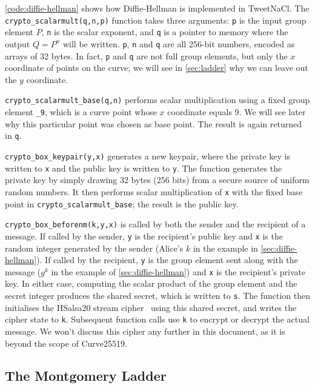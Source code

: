 \documentclass{article}
\begin{document}
\autoref{code:diffie-hellman} shows how Diffie-Hellman is implemented in TweetNaCl.
The \verb|crypto_scalarmult(q,n,p)| function takes three arguments: \verb|p| is the input group element $P$, \verb|n| is the scalar exponent, and \verb|q| is a pointer to memory where the output $Q=P^n$ will be written.
\verb|p|, \verb|n| and \verb|q| are all 256-bit numbers, encoded as arrays of 32 bytes.
In fact, \verb|p| and \verb|q| are not full group elements, but only the $x$ coordinate of points on the curve; we will see in \autoref{sec:ladder} why we can leave out the $y$ coordinate.

\verb|crypto_scalarmult_base(q,n)| performs scalar multiplication using a fixed group element \verb|_9|, which is a curve point whose $x$ coordinate equals 9.
We will see later why this particular point was chosen as base point.
The result is again returned in \verb|q|.

\verb|crypto_box_keypair(y,x)| generates a new keypair, where the private key is written to \verb|x| and the public key is written to \verb|y|.
The function generates the private key by simply drawing 32 bytes (256 bits) from a secure source of uniform random numbers.
It then performs scalar multiplication of \verb|x| with the fixed base point in \verb|crypto_scalarmult_base|; the result is the public key.

\verb|crypto_box_beforenm(k,y,x)| is called by both the sender and the recipient of a message.
If called by the sender, \verb|y| is the recipient's public key and \verb|x| is the random integer generated by the sender (Alice's $k$ in the example in \autoref{sec:diffie-hellman}).
If called by the recipient, \verb|y| is the group element sent along with the message ($g^k$ in the example of \autoref{sec:diffie-hellman}) and \verb|x| is the recipient's private key.
In either case, computing the scalar product of the group element and the secret integer produces the shared secret, which is written to \verb|s|.
The function then initialises the HSalsa20 stream cipher~\cite{Bernstein:2014ca} using this shared secret, and writes the cipher state to \verb|k|.
Subsequent function calls use \verb|k| to encrypt or decrypt the actual message.
We won't discuss this cipher any further in this document, as it is beyond the scope of Curve25519.

\subsection{The Montgomery Ladder}\label{sec:ladder}
\end{document}
